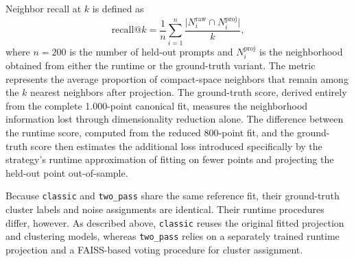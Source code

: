 Neighbor recall at $k$ is defined as
\[
\text{recall@}k = \frac{1}{n}\sum_{i=1}^{n} \frac{\lvert N_i^{\text{raw}} \cap N_i^{\text{proj}} \rvert}{k},
\]
where $n = 200$ is the number of held-out prompts and $N_i^{\text{proj}}$ is the neighborhood obtained from either the runtime or the ground-truth variant. The metric represents the average proportion of compact-space neighbors that remain among the $k$ nearest neighbors after projection. The ground-truth score, derived entirely from the complete 1.000-point canonical fit, measures the neighborhood information lost through dimensionality reduction alone. The difference between the runtime score, computed from the reduced 800-point fit, and the ground-truth score then estimates the additional loss introduced specifically by the strategy's runtime approximation of fitting on fewer points and projecting the held-out point out-of-sample.

\begin{table}[htbp]
\centering
\caption{Held-out accuracy per strategy. Neighbor recall is reported as runtime-model / ground-truth-model}
\label{tbl:held-out-accuracy}
\end{table}

Because \texttt{classic} and \texttt{two\_pass} share the same reference fit, their ground-truth cluster labels and noise assignments are identical. Their runtime procedures differ, however. As described above, \texttt{classic} reuses the original fitted projection and clustering models, whereas \texttt{two\_pass} relies on a separately trained runtime projection and a FAISS-based voting procedure for cluster assignment.

